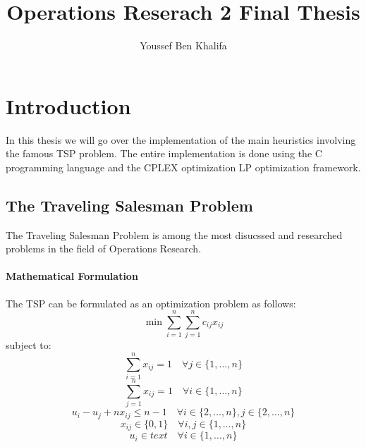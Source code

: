 \documentclass{article}
\title{Operations Reserach 2 Final Thesis}
\author{Youssef Ben Khalifa}
\begin{document}
\maketitle

\section{Introduction}

In this thesis we will go over the implementation of the main heuristics involving the famous TSP problem. The entire implementation is done using the C programming language and the CPLEX optimization LP optimization framework.
\subsection{The Traveling Salesman Problem}
The Traveling Salesman Problem is among the most disucssed and researched problems in the field of Operations Research.

\paragraph{Mathematical Formulation}
The TSP can be formulated as an optimization problem as follows:
\begin{equation}
	\min \sum_{i=1}^{n} \sum_{j=1}^{n} c_{ij} x_{ij}
\end{equation}
subject to:
\begin{equation}
	\sum_{i=1}^{n} x_{ij} = 1 \quad \forall j \in \{1, \ldots, n\}
\end{equation}
\begin{equation}
	\sum_{j=1}^{n} x_{ij} = 1 \quad \forall i \in \{1, \ldots, n\}
\end{equation}
\begin{equation}
	u_i - u_j + nx_{ij} \leq n-1 \quad \forall i \in \{2, \ldots, n\}, j \in \{2, \ldots, n\}
\end{equation}
\begin{equation}
	x_{ij} \in \{0, 1\} \quad \forall i, j \in \{1, \ldots, n\}
\end{equation}
\begin{equation}
	u_i \in \mathit{text} \quad \forall i \in \{1, \ldots, n\}
\end{equation}
\end{document}

